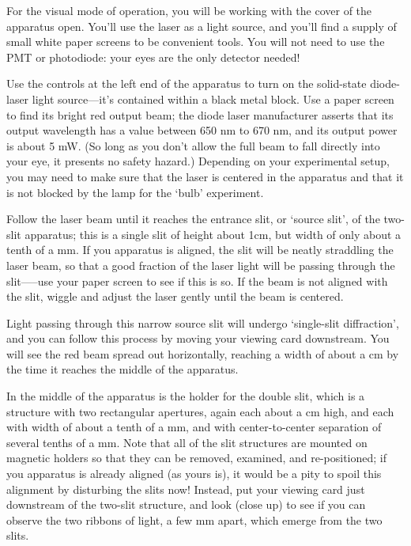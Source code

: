 \documentclass[11pt]{article}
\begin{document}
\vspace{5mm}


For the visual mode of operation, you will be working with the cover of the
apparatus open. You’ll use the laser as a light
source, and you’ll find a supply of small white paper screens to be convenient
tools. You will not need to use the PMT or photodiode: your eyes are the 
only detector needed!

Use the controls at the left end of the apparatus to turn on the solid-state
diode-laser light source—it’s contained within a black metal block. Use a paper
screen to find its bright red output beam; the diode laser manufacturer asserts
that its output wavelength has a value between 650 nm to 670 nm, and its output
power is about 5 mW. (So long as you don’t allow the full beam to fall directly
into your eye, it presents no safety hazard.) Depending on your experimental setup,
you may need to make sure that the laser is centered in the apparatus and that
it is not blocked by the lamp for the `bulb' experiment.

Follow the laser beam until it reaches the entrance slit, or ‘source slit’, of
the two-slit apparatus; this is a single slit of height about 1cm, but width of
only about a tenth of a mm. If you apparatus is aligned, the slit will be neatly
straddling the laser beam, so that a good fraction of the laser light will be
passing through the slit—--use your paper screen to see if this is so. If the beam
is not aligned with the slit, wiggle and adjust the laser gently until the beam 
is centered.

Light passing through this narrow source slit will undergo ‘single-slit
diffraction’, and you can follow this process by moving your viewing card
downstream. You will see the red beam spread out horizontally, reaching a width
of about a cm by the time it reaches the middle of the apparatus.

In the middle of the apparatus is the holder for the double slit, which is a
structure with two rectangular apertures, again each about a cm high, and each
with width of about a tenth of a mm, and with center-to-center separation of
several tenths of a mm. Note that all of the slit structures are mounted on magnetic
holders so that they can be removed, examined, and re-positioned; if you
apparatus is already aligned (as yours is), it would be a pity to spoil this
alignment by disturbing the slits now! Instead, put your viewing card just
downstream of the two-slit structure, and look (close up) to see if you can
observe the two ribbons of light, a few mm apart, which emerge from the two
slits.
\end{document}

